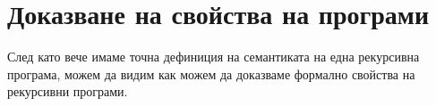 \chapter{Доказване на свойства на програми}

След като вече имаме точна дефиниция на семантиката на една рекурсивна програма, можем да видим как можем да доказваме
формално свойства на рекурсивни програми.





